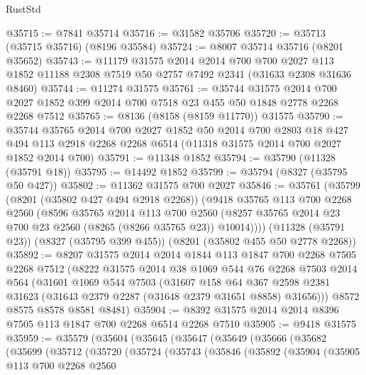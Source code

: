 \begin{lexlean}{RustStd}
\begin{coremodule}
@35715 := @7841 @35714
@35716 := @31582 @35706
@35720 := @35713 (@35715 @35716) (@8196 @35584)
@35724 := @8007 @35714 @35716 (@8201 @35652)
@35743 := @11179
    @31575
    @2014
    @2014
    @700
    @700
    @2027
    @113
    @1852
    @11188
    @2308
    @7519
    @50
    @2757
    @7492
    @2341
    (@31633 @2308 @31636 @8460)
@35744 := @11274 @31575
@35761 := @35744
    @31575
    @2014
    @700
    @2027
    @1852
    @399
    @2014
    @700
    @7518
    @23
    @455
    @50
    @1848
    @2778
    @2268
    @2268
    @7512
@35765 := @8136 (@8158 (@8159 @11770)) @31575
@35790 := @35744
    @35765
    @2014
    @700
    @2027
    @1852
    @50
    @2014
    @700
    @2803
    @18
    @427
    @494
    @113
    @2918
    @2268
    @2268
    @6514
    (@11318 @31575 @2014 @700 @2027 @1852 @2014 @700)
@35791 := @11348 @1852
@35794 := @35790 (@11328 (@35791 @18))
@35795 := @14492 @1852
@35799 := @35794 (@8327 (@35795 @50 @427))
@35802 := @11362 @31575 @700 @2027
@35846 := @35761
    (@35799
      (@8201 (@35802 @427 @494 @2918 @2268))
      (@9418
        @35765
        @113
        @700
        @2268
        @2560
        (@8596
          @35765
          @2014
          @113
          @700
          @2560
          (@8257 @35765 @2014 @23 @700 @23 @2560 (@8265 (@8266 @35765 @23)) @10014))))
    (@11328 (@35791 @23))
    (@8327 (@35795 @399 @455))
    (@8201 (@35802 @455 @50 @2778 @2268))
@35892 := @8207
    @31575
    @2014
    @2014
    @1844
    @113
    @1847
    @700
    @2268
    @7505
    @2268
    @7512
    (@8222
      @31575
      @2014
      @38
      @1069
      @544
      @76
      @2268
      @7503
      @2014
      @564
      (@31601
        @1069
        @544
        @7503
        (@31607
          @158
          @64
          @367
          @2598
          @2381
          @31623
          (@31643 @2379 @2287 (@31648 @2379 @31651 @8858) @31656)))
      @8572
      @8575
      @8578
      @8581
      @8481)
@35904 := @8392 @31575 @2014 @2014 @8396 @7505 @113 @1847 @700 @2268 @6514 @2268 @7510
@35905 := @9418 @31575
@35959 := @35579
    (@35604
      (@35645
        (@35647
          (@35649
            (@35666
              (@35682
                (@35699
                  (@35712
                    (@35720
                      (@35724
                        (@35743
                          (@35846
                            (@35892
                              (@35904
                                (@35905
                                  @113
                                  @700
                                  @2268
                                  @2560

\end{coremodule}
\end{lexlean}
